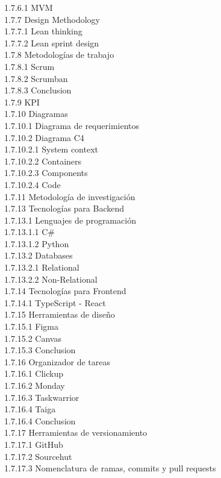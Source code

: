 1.7.6.1 MVM\\
1.7.7 Design Methodology\\
1.7.7.1 Lean thinking\\
1.7.7.2 Lean sprint design\\
1.7.8 Metodologías de trabajo\\
1.7.8.1 Scrum\\
1.7.8.2 Scrumban\\
1.7.8.3 Conclusion\\
1.7.9 KPI\\
1.7.10 Diagramas\\
1.7.10.1 Diagrama de requerimientos\\
1.7.10.2 Diagrama C4\\
1.7.10.2.1 System context\\
1.7.10.2.2 Containers\\
1.7.10.2.3 Components\\
1.7.10.2.4 Code\\
1.7.11 Metodología de investigación\\
1.7.13 Tecnologías para Backend\\
1.7.13.1 Lenguajes de programación\\
1.7.13.1.1 C\#\\
1.7.13.1.2 Python\\
1.7.13.2 Databases\\
1.7.13.2.1 Relational\\
1.7.13.2.2 Non-Relational\\
1.7.14 Tecnologías para Frontend\\
1.7.14.1 TypeScript - React\\
1.7.15 Herramientas de diseño\\
1.7.15.1 Figma\\
1.7.15.2 Canvas\\
1.7.15.3 Conclusion\\
1.7.16 Organizador de tareas\\
1.7.16.1 Clickup\\
1.7.16.2 Monday\\
1.7.16.3 Taskwarrior\\
1.7.16.4 Taiga\\
1.7.16.4 Conclusion\\
1.7.17 Herramientas de versionamiento\\
1.7.17.1 GitHub\\
1.7.17.2 Sourcehut\\
1.7.17.3 Nomenclatura de ramas, commits y pull requests\\
